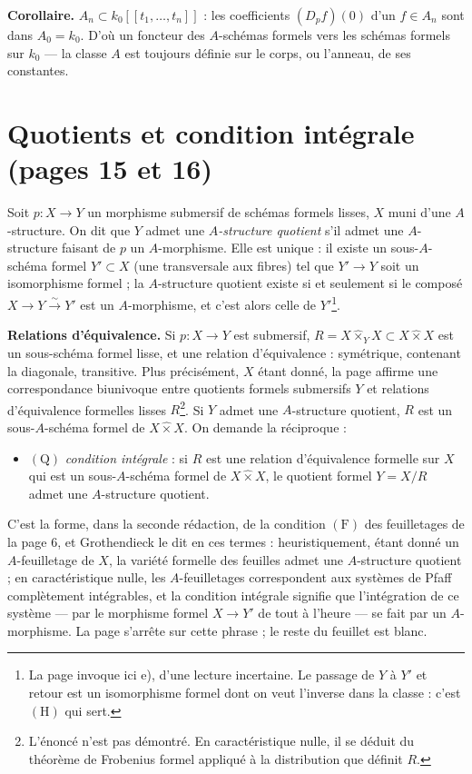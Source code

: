 \documentclass[11pt,a4paper]{article}
\begin{document}
\textbf{Corollaire.} $A_n \subset k_0[[t_1, \ldots, t_n]]$ : les coefficients
$(D_p f)(0)$ d'un $f \in A_n$ sont dans $A_0 = k_0$. D'où un foncteur des
$A$-schémas formels vers les schémas formels sur $k_0$ — la classe $A$ est
toujours définie sur le corps, ou l'anneau, de ses constantes.

\section*{Quotients et condition intégrale (pages 15 et 16)}

Soit $p : X \to Y$ un morphisme submersif de schémas formels lisses, $X$ muni
d'une $A$-structure. On dit que $Y$ admet une \emph{$A$-structure quotient} s'il
admet une $A$-structure faisant de $p$ un $A$-morphisme. Elle est unique : il
existe un sous-$A$-schéma formel $Y' \subset X$ (une transversale aux fibres) tel
que $Y' \to Y$ soit un isomorphisme formel ; la $A$-structure quotient existe si
et seulement si le composé $X \to Y \xrightarrow{\sim} Y'$ est un $A$-morphisme,
et c'est alors celle de $Y'$\footnote{La page invoque ici e), d'une lecture
incertaine. Le passage de $Y$ à $Y'$ et retour est un isomorphisme formel
dont on veut l'inverse dans la classe : c'est $(\mathrm{H})$ qui sert.}.

\textbf{Relations d'équivalence.} Si $p : X \to Y$ est submersif,
$R = X \mathbin{\widehat{\times}_Y} X \subset X \mathbin{\widehat{\times}} X$ est un
sous-schéma formel lisse, et une relation d'équivalence : symétrique, contenant
la diagonale, transitive. Plus précisément, $X$ étant donné, la page affirme
une correspondance biunivoque entre quotients formels submersifs $Y$ et
relations d'équivalence formelles lisses $R$\footnote{L'énoncé n'est pas
démontré. En caractéristique nulle, il se déduit du théorème de Frobenius
formel appliqué à la distribution que définit $R$.}. Si $Y$ admet une
$A$-structure quotient, $R$ est un sous-$A$-schéma formel de
$X \mathbin{\widehat{\times}} X$. On demande la réciproque :

\begin{itemize}
  \item $(\mathrm{Q})$ \emph{condition intégrale} : si $R$ est une relation
    d'équivalence formelle sur $X$ qui est un sous-$A$-schéma formel de
    $X \mathbin{\widehat{\times}} X$, le quotient formel $Y = X/R$ admet une
    $A$-structure quotient.
\end{itemize}

C'est la forme, dans la seconde rédaction, de la condition $(\mathrm{F})$ des
feuilletages de la page 6, et Grothendieck le dit en ces termes :
heuristiquement, étant donné un $A$-feuilletage de $X$, la variété formelle des
feuilles admet une $A$-structure quotient ; en caractéristique nulle, les
$A$-feuilletages correspondent aux systèmes de Pfaff complètement intégrables,
et la condition intégrale signifie que l'intégration de ce système — par le
morphisme formel $X \to Y'$ de tout à l'heure — se fait par un $A$-morphisme. La
page s'arrête sur cette phrase ; le reste du feuillet est blanc.
\end{document}
